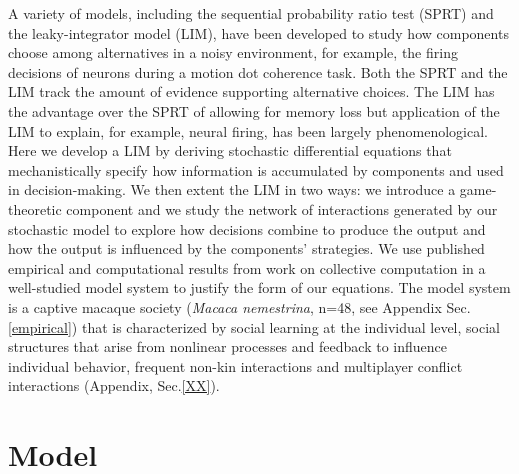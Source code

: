 \documentclass{article}
\begin{document}
A variety of models, including the sequential probability ratio test (SPRT) and the leaky-integrator model (LIM), have been developed to study how components choose among alternatives in a noisy environment, for example, the firing decisions of neurons during a motion dot coherence task. Both the SPRT and the LIM track the amount of evidence supporting alternative choices. The LIM has the advantage over the SPRT of allowing for memory loss but application of the LIM to explain, for example, neural firing, has been largely phenomenological. Here we develop a LIM by deriving stochastic differential equations that mechanistically specify how information is accumulated by components and used in decision-making. We then extent the LIM in two ways: we introduce a game-theoretic component and we study the network of interactions generated by our stochastic model to explore how decisions combine to produce the output and how the output is influenced by the components' strategies. We use published empirical and computational results from work on collective computation in a well-studied model system to justify the form of our equations. The model system is a captive macaque society (\emph{Macaca nemestrina}, n=48, see Appendix Sec. \ref{empirical}) that is characterized by 
social learning at the individual level, social structures that arise from nonlinear processes and feedback to influence individual behavior, frequent non-kin interactions and multiplayer conflict interactions 
(Appendix, Sec.\ref{XX})\cite {Flack:2007ir, Flack:2006jh, Flack:2006vi, Flack:2005ih, Flack:2005dg, Thierry:2004tj}. 

\section*{Model} 
\end{document}

